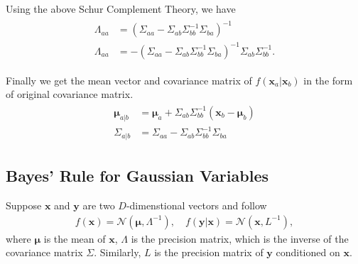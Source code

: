 {Using the above Schur Complement Theory, we have 
\begin{align}
\begin{split}
\Lambda_{aa} & =(\Sigma_{aa}-\Sigma_{ab}\Sigma_{bb}^{-1}\Sigma_{ba})^{-1} \\
\Lambda_{aa} & = -(\Sigma_{aa}-\Sigma_{ab}\Sigma_{bb}^{-1}\Sigma_{ba})^{-1}\Sigma_{ab}\Sigma_{bb}^{-1}.
\end{split}
\end{align}

Finally we get the mean vector and covariance matrix of $f(\mathbf{x}_a|\mathbf{x}_b)$ in the form of original covariance matrix.
\begin{align}
\begin{split}
\mathbf{\mu}_{a|b} & = \mathbf{\mu}_a + \Sigma_{ab}\Sigma_{bb}^{-1}(\mathbf{x}_b - \mathbf{\mu}_b) \\
\Sigma_{a|b} & = \Sigma_{aa}-\Sigma_{ab}\Sigma_{bb}^{-1}\Sigma_{ba}
\end{split}
\end{align}

\subsection{Bayes' Rule for Gaussian Variables}
Suppose $\mathbf{x}$ and $\mathbf{y}$ are two $D$-dimenstional vectors and follow
\begin{align}
f(\mathbf{x})=\mathcal{N}\left(\mathbf{\mu},\Lambda^{-1}\right), \quad f(\mathbf{y}|\mathbf{x})=\mathcal{N}(\mathbf{x},L^{-1}),
\end{align}
where $\mathbf{\mu}$ is the mean of $\mathbf{x}$, $\Lambda$ is the precision matrix, which is the inverse of the covariance matrix $\Sigma$. Similarly, $L$ is the precision matrix of $\mathbf{y}$ conditioned on $\mathbf{x}$.

}
